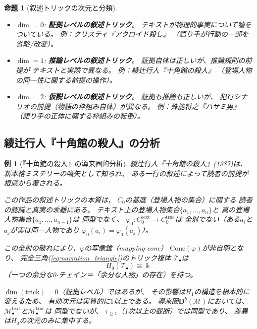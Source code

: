 \documentclass[12pt,twocolumn]{ltjsarticle}
\newtheorem{proposition}[theorem]{命題}
\newtheorem{example}[theorem]{例}
\newcommand{\Mys}{\mathcal{M}}
\newcommand{\kk}{\Bbbk}
\newcommand{\Db}{\mathbf{D}^b}
\begin{document}
\begin{proposition}[叙述トリックの次元と分類]
\label{prop:trick_dimension}
\phantom{.}
\begin{itemize}
\item $\dim = 0$: \textbf{証拠レベルの叙述トリック}。
テキストが物理的事実について嘘をついている。
例：クリスティ『アクロイド殺し』
（語り手が行動の一部を省略/改変）。

\item $\dim = 1$: \textbf{推論レベルの叙述トリック}。
証拠自体は正しいが、推論規則の前提が
テキストと実際で異なる。
例：綾辻行人『十角館の殺人』
（登場人物の同一性に関する前提の操作）。

\item $\dim = 2$: \textbf{仮説レベルの叙述トリック}。
証拠も推論も正しいが、
犯行シナリオの前提（物語の枠組み自体）が異なる。
例：殊能将之『ハサミ男』
（語り手の正体に関する枠組みの転倒）。
\end{itemize}
\end{proposition}


\subsection{綾辻行人『十角館の殺人』の分析}

\begin{example}[『十角館の殺人』の導来圏的分析]
\label{ex:jukkakukan}
綾辻行人『十角館の殺人』(1987)は、
新本格ミステリーの嚆矢として知られ、
ある一行の叙述によって読者の前提が根底から覆される。

この作品の叙述トリックの本質は、
$C_0$の基底（登場人物の集合）に関する
読者の認識と真実の乖離にある。
テキスト上の登場人物集合$\{a_1, \ldots, a_n\}$と
真の登場人物集合$\{\tilde{a}_1, \ldots, \tilde{a}_{n-1}\}$は
同型でなく、
$\varphi_0: C_0^{\text{text}} \to C_0^{\text{true}}$は
全射でない（ある$a_i$と$a_j$が実は同一人物であり
$\varphi_0(a_i) = \varphi_0(a_j)$）。

この全射の破れにより、$\varphi$の写像錐（mapping cone）
$\mathrm{Cone}(\varphi)$が非自明となり、
完全三角(\ref{eq:narration_triangle})のトリック複体
$\mathcal{T}_\bullet$は
\begin{equation}
H_0(\mathcal{T}_\bullet) \cong \kk
\end{equation}
（一つの余分な0-チェイン＝「余分な人物」の存在）を持つ。

$\dim(\text{trick}) = 0$（証拠レベル）ではあるが、
その影響は$H_1$の構造を根本的に変えるため、
有効次元は実質的に$1$以上である。
導来圏$\Db(\Mys)$においては、
$\Mys^{\text{text}}_\bullet$と$\Mys^{\text{true}}_\bullet$は
同型でないが、
$\tau_{\geq 1}$（1次以上の截断）では同型であり、
差異は$H_0$の次元のみに集中する。
\end{example}
\end{document}
